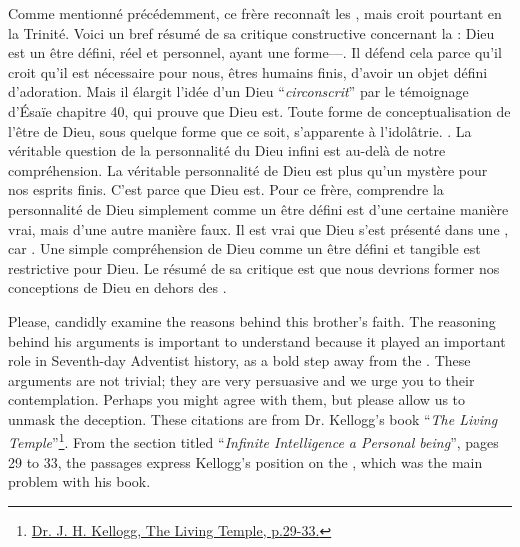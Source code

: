Comme mentionné précédemment, ce frère reconnaît les , mais croit pourtant en la Trinité. Voici un bref résumé de sa critique constructive concernant la  : Dieu est un être défini, réel et personnel, ayant une forme—. Il défend cela parce qu'il croit qu'il est nécessaire pour nous, êtres humains finis, d'avoir un objet défini d'adoration. Mais il élargit l'idée d'un Dieu “\textit{circonscrit}” par le témoignage d'Ésaïe chapitre 40, qui prouve que Dieu est. Toute forme de conceptualisation de l'être de Dieu, sous quelque forme que ce soit, s'apparente à l'idolâtrie. . La véritable question de la personnalité du Dieu infini est au-delà de notre compréhension. La véritable personnalité de Dieu est plus qu'un mystère pour nos esprits finis. C'est parce que Dieu est. Pour ce frère, comprendre la personnalité de Dieu simplement comme un être défini est d'une certaine manière vrai, mais d'une autre manière faux. Il est vrai que Dieu s'est présenté dans une , car . Une simple compréhension de Dieu comme un être défini et tangible est restrictive pour Dieu. Le résumé de sa critique est que nous devrions former nos conceptions de Dieu en dehors des .


Please, candidly examine the reasons behind this brother’s faith. The reasoning behind his arguments is important to understand because it played an important role in Seventh-day Adventist history, as a bold step away from the . These arguments are not trivial; they are very persuasive and we urge you to their contemplation. Perhaps you might agree with them, but please allow us to unmask the deception. These citations are from Dr. Kellogg’s book “\textit{The Living Temple}”\footnote{\href{https://archive.org/details/J.H.Kellogg.TheLivingTemple1903}{Dr. J. H. Kellogg, The Living Temple, p.29-33.}}. From the section titled “\textit{Infinite Intelligence a Personal being}”, pages 29 to 33, the passages express Kellogg’s position on the , which was the main problem with his book.


